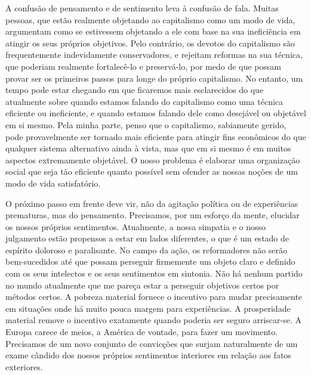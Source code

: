 \documentclass[12pt]{article}
\begin{document}
A confusão de pensamento e de sentimento leva à confusão de fala. Muitas pessoas, que estão realmente objetando ao capitalismo como um modo de vida, argumentam como se estivessem objetando a ele com base na sua ineficiência em atingir os seus próprios objetivos. Pelo contrário, os devotos do capitalismo são frequentemente indevidamente conservadores, e rejeitam reformas na sua técnica, que poderiam realmente fortalecê-lo e preservá-lo, por medo de que possam provar ser os primeiros passos para longe do próprio capitalismo. No entanto, um tempo pode estar chegando em que ficaremos mais esclarecidos do que atualmente sobre quando estamos falando do capitalismo como uma técnica eficiente ou ineficiente, e quando estamos falando dele como desejável ou objetável em si mesmo. Pela minha parte, penso que o capitalismo, sabiamente gerido, pode provavelmente ser tornado mais eficiente para atingir fins econômicos do que qualquer sistema alternativo ainda à vista, mas que em si mesmo é em muitos aspectos extremamente objetável. O nosso problema é elaborar uma organização social que seja tão eficiente quanto possível sem ofender as nossas noções de um modo de vida satisfatório.

O próximo passo em frente deve vir, não da agitação política ou de experiências prematuras, mas do pensamento. Precisamos, por um esforço da mente, elucidar os nossos próprios sentimentos. Atualmente, a nossa simpatia e o nosso julgamento estão propensos a estar em lados diferentes, o que é um estado de espírito doloroso e paralisante. No campo da ação, os reformadores não serão bem-sucedidos até que possam perseguir firmemente um objeto claro e definido com os seus intelectos e os seus sentimentos em sintonia. Não há nenhum partido no mundo atualmente que me pareça estar a perseguir objetivos certos por métodos certos. A pobreza material fornece o incentivo para mudar precisamente em situações onde há muito pouca margem para experiências. A prosperidade material remove o incentivo exatamente quando poderia ser seguro arriscar-se. A Europa carece de meios, a América de vontade, para fazer um movimento. Precisamos de um novo conjunto de convicções que surjam naturalmente de um exame cândido dos nossos próprios sentimentos interiores em relação aos fatos exteriores.
\end{document}
